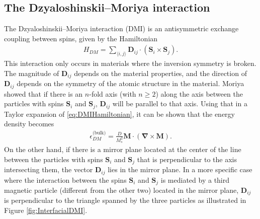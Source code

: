 \subsection{The Dzyaloshinskii--Moriya interaction}
The Dzyaloshinskii--Moriya interaction (DMI) is an antisymmetric exchange coupling between spins, given by the Hamiltonian
\begin{align}
H_{DM} = \sum_{\langle i,j\rangle}\mathbold{D}_{ij}\cdot(\mathbold{S}_i\times\mathbold{S}_j). \label{eq:DMIHamiltonian}
\end{align}
This interaction only occurs in materials where the inversion symmetry is broken. The magnitude of $\mathbold{D}_{ij}$ depends on the material properties, and the direction of $\mathbold{D}_{ij}$ depends on the symmetry of the atomic structure in the material. Moriya showed \cite{Moriya1960} that if there is an $n$-fold axis (with $n \geq 2$) along the axis between the particles with spins $\mathbold{S}_i$ and $\mathbold{S}_j$, $\mathbold{D}_{ij}$ will be parallel to that axis. Using that in a Taylor expansion of \eqref{eq:DMIHamiltonian}, it can be shown \cite{Project} that the energy density becomes
\begin{align}
\label{eq:DMBulk}
\epsilon_{DM}^{\textrm{(bulk)}} = \frac{D}{M_s^2}\mathbold{M}\cdot(\mathbold{\nabla}\times\mathbold{M}).
\end{align}
On the other hand, if there is a mirror plane located at the center of the line between the particles with spins $\mathbold{S}_i$ and $\mathbold{S}_j$ that is perpendicular to the axis intersecting them, the vector $\mathbold{D}_{ij}$ lies in the mirror plane. In a more specific case where the interaction between the spins $\mathbold{S}_i$ and $\mathbold{S}_j$ is mediated by a third magnetic particle (different from the other two) located in the mirror plane, $\mathbold{D}_{ij}$ is perpendicular to the triangle spanned by the three particles as illustrated in Figure \ref{fig:InterfacialDMI}. 
